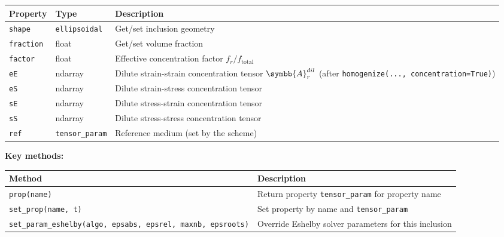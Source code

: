 \documentclass[
  a4paper,
  numbers=noendperiod,
  DIV=12]{scrreprt}
\newcounter{none} %
\newcommand{\uuuu}[1]{{\symbb{{#1}}}}
\begin{document}
{\def\LTcaptype{none} %
\begin{longtable}[]{@{}
  >{\raggedright\arraybackslash}p{}
  >{\raggedright\arraybackslash}p{}
  >{\raggedright\arraybackslash}p{}@{}}
\toprule\noalign{}
\begin{minipage}[b]{\linewidth}\raggedright
Property
\end{minipage} & \begin{minipage}[b]{\linewidth}\raggedright
Type
\end{minipage} & \begin{minipage}[b]{\linewidth}\raggedright
Description
\end{minipage} \\
\midrule\noalign{}
\endhead
\bottomrule\noalign{}
\endlastfoot
\texttt{shape} & \texttt{ellipsoidal} & Get/set inclusion geometry \\
\texttt{fraction} & float & Get/set volume fraction \\
\texttt{factor} & float & Effective concentration factor
\(f_r / f_\text{total}\) \\
\texttt{eE} & ndarray & Dilute strain-strain concentration tensor
\(\uuuu{A}_r^{dil}\) (after
\texttt{homogenize(...,\ concentration=True)}) \\
\texttt{eS} & ndarray & Dilute strain-stress concentration tensor \\
\texttt{sE} & ndarray & Dilute stress-strain concentration tensor \\
\texttt{sS} & ndarray & Dilute stress-stress concentration tensor \\
\texttt{ref} & \texttt{tensor\_param} & Reference medium (set by the
scheme) \\
\end{longtable}
}

\textbf{Key methods:}

{\def\LTcaptype{none} %
\begin{longtable}[]{@{}
  >{\raggedright\arraybackslash}p{}
  >{\raggedright\arraybackslash}p{}@{}}
\toprule\noalign{}
\begin{minipage}[b]{\linewidth}\raggedright
Method
\end{minipage} & \begin{minipage}[b]{\linewidth}\raggedright
Description
\end{minipage} \\
\midrule\noalign{}
\endhead
\bottomrule\noalign{}
\endlastfoot
\texttt{prop(name)} & Return property \texttt{tensor\_param} for
property name \\
\texttt{set\_prop(name,\ t)} & Set property by name and
\texttt{tensor\_param} \\
\texttt{set\_param\_eshelby(algo,\ epsabs,\ epsrel,\ maxnb,\ epsroots)}
& Override Eshelby solver parameters for this inclusion \\
\end{longtable}
}
\end{document}
